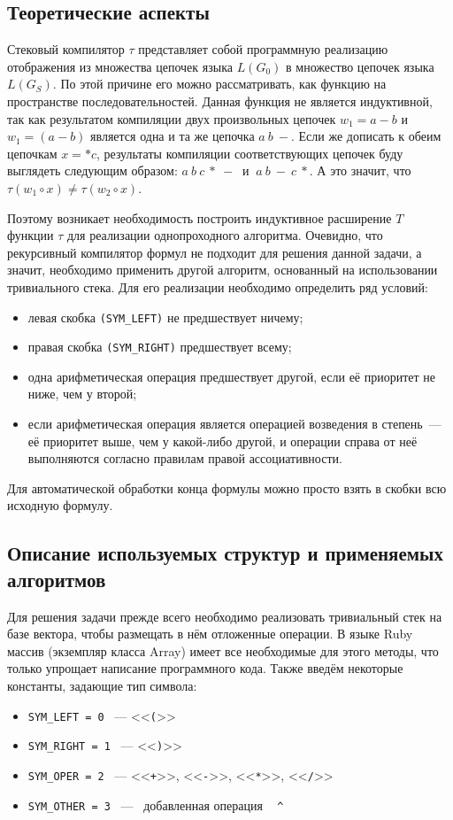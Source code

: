 \subsection*{Теоретические аспекты}

Стековый компилятор $\tau$ представляет собой программную реализацию отображения из множества цепочек языка $L(G_0)$ в множество цепочек языка $L(G_S)$. По этой причине его можно рассматривать, как функцию на пространстве последовательностей. Данная функция не является индуктивной, так как результатом компиляции двух произвольных цепочек $w_1 = a-b$ и $w_1 = (a-b)$ является одна и та же цепочка $a \ b \ -$. Если же дописать к обеим цепочкам $x=*c$, результаты компиляции соответствующих цепочек буду выглядеть следующим образом: $a \ b \ c \ * \ - \ $   и  $ \ a \ b \ - \ c \ *$. А это значит, что $\tau(w_1\circ x) \ne \tau(w_2\circ x)$.

Поэтому возникает необходимость построить индуктивное расширение $T$ функции $\tau$ для реализации однопроходного алгоритма. Очевидно, что рекурсивный компилятор формул не подходит для решения данной задачи, а значит, необходимо применить другой алгоритм, основанный на использовании тривиального стека. Для его реализации необходимо определить ряд условий: \\
\begin{itemize}
\item левая скобка \verb|(SYM_LEFT)| не предшествует ничему;
\item правая скобка \verb|(SYM_RIGHT)| предшествует всему;
\item одна арифметическая операция предшествует другой, если её приоритет не ниже, чем у второй;
\item если арифметическая операция является операцией возведения в степень~--- её приоритет выше, чем у какой-либо другой, и операции справа от неё выполняются согласно правилам правой ассоциативности.
\end{itemize} 


Для автоматической обработки конца формулы можно просто взять в скобки всю исходную формулу.

\subsection*{Описание используемых структур и применяемых алгоритмов}

Для решения задачи прежде всего необходимо реализовать тривиальный стек на базе вектора, чтобы размещать в нём отложенные операции. В языке Ruby массив (экземпляр класса Array) имеет все необходимые для этого методы, что только упрощает написание программного кода.
Также введём некоторые константы, задающие тип символа:
\begin{itemize}
\item \verb|SYM_LEFT = 0|  ~---  <<\verb|(|>> 
\item \verb|SYM_RIGHT = 1| ~--- <<\verb|)|>> 
\item \verb|SYM_OPER = 2| ~--- <<\verb|+|>>, <<\verb|-|>>, <<\verb|*|>>, <<\verb|/|>> 
\item \verb|SYM_OTHER = 3| ~---~ добавленная операция ~  \verb|^|
\end{itemize}


